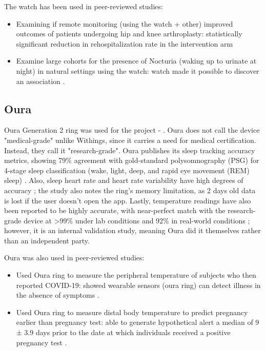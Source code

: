 The watch has been used in peer-reviewed studies:
\begin{itemize}
    \item Examining if remote monitoring (using the watch + other) improved outcomes of patients undergoing hip and knee arthroplasty: statistically significant reduction in rehospitalization rate in the intervention arm \cite{withingsHospitalization}
    \item Examine large cohorts for the presence of Nocturia (waking up to urinate at night) in natural settings using the watch: watch made it possible to discover an association \cite{withingsNocturia}.
\end{itemize}


\subsection{Oura}
\label{section:OuraRing}
Oura Generation 2 ring was used for the project - \cite{ouraStorePage}. Oura does not call the device "medical-grade" unlike Withings, since it carries a need for medical certification. Instead, they call it "research-grade". Oura publishes its sleep tracking accuracy metrics, showing 79\% agreement with gold-standard polysomnography (PSG) for 4-stage sleep classification (wake, light, deep, and rapid eye movement (REM) sleep) \cite{OuraSleepAcc}. Also, sleep heart rate and heart rate variability have high degrees of accuracy \cite{ouraHeartAcc}; the study also notes the ring's memory limitation, as 2 days old data is lost if the user doesn't open the app. Lastly, temperature readings have also been reported to be highly accurate, with near-perfect match with the research-grade device at >99\% under lab conditions and 92\% in real-world conditions \cite{ouraTemp}; however, it is an internal validation study, meaning Oura did it themselves rather than an independent party.

Oura was also used in peer-reviewed studies:
\begin{itemize}
    \item Used Oura ring to measure the peripheral temperature of subjects who then reported COVID-19: showed wearable sensors (oura ring) can detect illness in the absence of symptoms \cite{smarr2020feasibility}.
    \item Used Oura ring to measure distal body temperature to predict pregnancy earlier than pregnancy test: able to generate hypothetical alert a median of 9 ± 3.9 days prior to the date at which individuals received a positive pregnancy test \cite{ouraPregnancy}.
\end{itemize}
